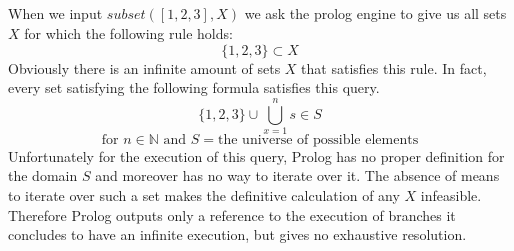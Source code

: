\documentclass[]{article}
\begin{document}
\subsection{}
When we input $subset([1,2,3],X)$ we ask the prolog engine to give us all sets $X$ for which the following rule holds:
$$\{1,2,3\}\subset X$$ 
Obviously there is an infinite amount of sets $X$ that satisfies this rule. In fact, every set satisfying the following formula satisfies this query. 
$$\{1,2,3\} \cup \bigcup\limits_{x=1}^n s\in S $$
$$\text{for } n\in \mathbb{N} \text{ and } S= \text{the universe of possible elements}$$
Unfortunately for the execution of this query, Prolog has no proper definition for the domain $S$ and moreover has no way to iterate over it. The absence of means to iterate over such a set makes the definitive calculation of any $X$ infeasible. Therefore Prolog outputs only a reference to the execution of  branches it concludes to have an infinite execution, but gives no exhaustive resolution.
\end{document}
